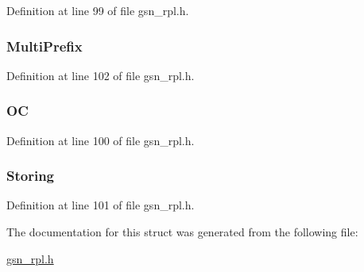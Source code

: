 Definition at line 99 of file gsn\_\-rpl.h.

\hypertarget{a00210_a89b1791cb249ade218357ff49b645164}{
\subsubsection[{MultiPrefix}]{ {\bf MultiPrefix}}}
\label{a00210_a89b1791cb249ade218357ff49b645164}


Definition at line 102 of file gsn\_\-rpl.h.

\hypertarget{a00210_a9aaa1e0a8619ea489c65aac22afbd4ad}{
\subsubsection[{OC}]{ {\bf OC}}}
\label{a00210_a9aaa1e0a8619ea489c65aac22afbd4ad}


Definition at line 100 of file gsn\_\-rpl.h.

\hypertarget{a00210_a5dab06a4773811901c55062a9a0de765}{
\subsubsection[{Storing}]{ {\bf Storing}}}
\label{a00210_a5dab06a4773811901c55062a9a0de765}


Definition at line 101 of file gsn\_\-rpl.h.



The documentation for this struct was generated from the following file:\begin{DoxyCompactItemize}
\item 
\hyperlink{a00579}{gsn\_\-rpl.h}\end{DoxyCompactItemize}

